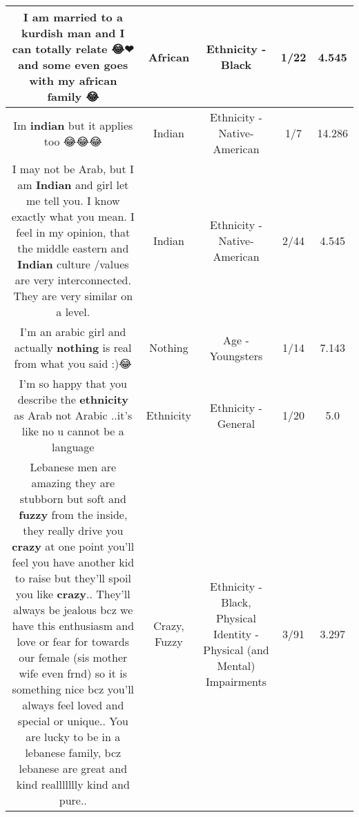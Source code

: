 \documentclass[11pt]{article}
\newlength\mylength
\begin{document}
\begin{center}
\begin{longtable}{|C{.65\mylength}|C{.30\mylength}|C{.12\mylength}|C{.12\mylength}|C{.12\mylength}|}
  \small I am married to a kurdish man and I can totally relate 😂❤ and some even goes with my \textbf{african} family 😂\normalsize   & African & Ethnicity - Black & 1/22 & 4.545 \\  \hline
  \small Im \textbf{indian} but it applies too 😂😂😂\normalsize   & Indian & Ethnicity - Native-American & 1/7 & 14.286 \\  \hline
  \small I may not be Arab, but I am \textbf{Indian} and girl let me tell you. I know exactly what you mean. I feel in my opinion, that the middle eastern and \textbf{Indian} culture /values are very interconnected. They are very similar on a level.\normalsize   & Indian & Ethnicity - Native-American & 2/44 & 4.545 \\  \hline
  \small I'm an arabic girl and actually \textbf{nothing} is real from what you said :)😂\normalsize   & Nothing & Age - Youngsters & 1/14 & 7.143 \\  \hline
  \small I'm so happy that you describe the \textbf{ethnicity} as Arab not Arabic ..it's like no u cannot be a language\normalsize   & Ethnicity & Ethnicity - General & 1/20 & 5.0 \\  \hline
  \small Lebanese men are amazing they are stubborn but soft and \textbf{fuzzy} from the inside, they really drive you \textbf{crazy} at one point you'll feel you have another kid to raise but they'll spoil you like \textbf{crazy}.. They'll always be jealous bcz we have this enthusiasm and love or fear for towards our female (sis mother wife even frnd) so it is something nice bcz you'll always feel loved and special or unique.. You are lucky to be in a lebanese family, bcz lebanese are great and kind reallllllly kind and pure..\normalsize   & Crazy, Fuzzy & Ethnicity - Black, Physical Identity - Physical (and Mental) Impairments & 3/91 & 3.297 \\  \hline

\end{longtable}
\end{center}
\end{document}

